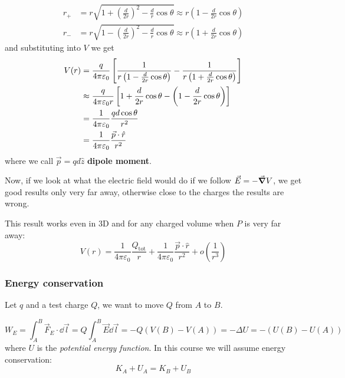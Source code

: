\documentclass[12pt]{extarticle}
\begin{document}
\begin{align}
	r_+ & = r \sqrt{1 + \left( \frac{d}{2r} \right)^2 - \frac{d}{r} \cos \theta} \approx r \left( 1- \frac{d}{2r} \cos \theta \right)  \\
	r_- & = r \sqrt{1 - \left( \frac{d}{2r} \right)^2 - \frac{d}{r} \cos \theta} \approx r \left( 1 + \frac{d}{2r} \cos \theta \right)
\end{align}
and substituting into $V$ we get
\begin{align}
	V(r) & = \frac{q}{4 \pi \varepsilon_0} \left[ \frac{1}{r \left( 1- \frac{d}{2r} \cos \theta \right)} - \frac{1}{r \left( 1 + \frac{d}{2r} \cos \theta \right)} \right] \\
	     & \approx  \frac{q}{4 \pi \varepsilon_0 r} \left[ 1 + \frac{d}{2r}\cos\theta - \left( 1- \frac{d}{2r} \cos \theta \right) \right]                                 \\
	     & = \frac{1}{4 \pi \varepsilon_0} \frac{q d \cos \theta}{r^2}                                                                                                     \\
	     & = \frac{1}{4 \pi \varepsilon_0} \frac{\vec p \cdot \hat r}{r^2}
\end{align}
where we call $\vec p = q d \hat z$ \textbf{dipole moment}.

Now, if we look at what the electric field would do if we follow $\vec E = - \grad V$, we get good results only very far away, otherwise close to the charges the results are wrong.

This result works even in 3D and for any charged volume when $P$ is very far away:
\begin{equation}
	V(r) = \frac{1}{4 \pi \varepsilon_0} \frac{Q_\text{tot}}{r} + \frac{1}{4 \pi \varepsilon_0} \frac{\vec p \cdot \hat r}{r^2} + o\left( \frac{1}{r^3} \right)
\end{equation}

\subsubsection{Energy conservation}

Let $q$ and a test charge $Q$, we want to move $Q$ from $A$ to $B$.

\begin{equation}
	W_E = \int_A^B \vec F_E \cdot \dd{\vec l} = Q \int_A^B \vec E \dd{\vec l} = - Q(V(B)- V(A)) = -\Delta U = - (U(B) - U(A))
\end{equation}
where $U$ is the \emph{potential energy function}.
In this course we will assume energy conservation:
\begin{equation}
	K_A + U_A = K_B + U_B
\end{equation}
\end{document}

